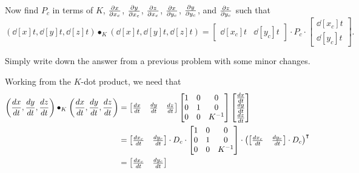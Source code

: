 \documentclass{ximera}
\begin{document}
\begin{problem}
  Now find $P_c$ in terms of $K$, $\pp[x]{x_c}$, $\pp[y]{x_c}$,
  $\pp[z]{x_c}$, $\pp[x]{y_c}$, $\pp[y]{y_c}$, and $\pp[z]{y_c}$
  such that
  \[
  \left(\dd[x]{t}, \dd[y]{t}, \dd[z]{t}\right)\bullet_K
  \left(\dd[x]{t}, \dd[y]{t}, \dd[z]{t}\right)
  =
  \begin{bmatrix}
    \dd[x_c]{t} &  \dd[y_c]{t}
  \end{bmatrix}
  \cdot P_c
  \cdot
  \begin{bmatrix}
    \dd[x_c]{t} \\  \dd[y_c]{t}
  \end{bmatrix}.
  \]
  \begin{hint}
  Simply write down the answer from a previous problem with some minor
  changes.
  \end{hint}
  \begin{freeResponse}
    Working from the $K$-dot product, we need that
    \begin{align*}
    \left(\dd[x]{t}, \dd[y]{t}, \dd[z]{t}\right)\bullet_K
    \left(\dd[x]{t}, \dd[y]{t}, \dd[z]{t}\right)
    &=
    \begin{bmatrix}
      \dd[x]{t} & \dd[y]{t} & \dd[z]{t}
    \end{bmatrix}
    \begin{bmatrix}
      1 & 0 & 0\\
      0 & 1 & 0\\
      0 & 0 & K^{-1}
    \end{bmatrix}
    \begin{bmatrix}
      \dd[x]{t} \\ \dd[y]{t} \\ \dd[z]{t}
    \end{bmatrix}\\
    &=
    \begin{bmatrix}
      \frac{dx_c}{dt} & \frac{dy_c}{dt}
    \end{bmatrix}\cdot D_{c}\cdot
    \begin{bmatrix}
      1 & 0 & 0\\
      0 & 1 & 0\\
    0 & 0 & K^{-1}
    \end{bmatrix}
    \cdot
    \left(
    \begin{bmatrix}
      \frac{dx_c}{dt} & \frac{dy_c}{dt}
    \end{bmatrix}\cdot D_{c}
    \right)^\transpose\\
    &=
    \begin{bmatrix}
      \frac{dx_c}{dt} & \frac{dy_c}{dt}

\end{bmatrix}
\end{align*}
\end{freeResponse}
\end{problem}
\end{document}
